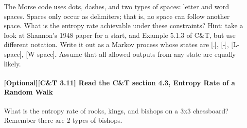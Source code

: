 \documentclass{article}
\begin{document}
The Morse code uses dots, dashes, and two types of spaces: letter and word
spaces.  Spaces only occur as delimiters; that is, no space can follow another
space. What is the entropy rate achievable under these constraints?  Hint: take
a look at Shannon’s 1948 paper for a start, and Example 5.1.3 of C\&T, but use
different notation. Write it out as a Markov process whose states are [.], [-],
[L-space], [W-space]. Assume that all allowed outputs from any state are equally
likely.  

\paragraph{[Optional][C\&T 3.11] Read the C\&T section 4.3, Entropy Rate of a
    Random Walk}  What is the entropy rate of rooks, kings, and bishops on a 3x3
chessboard?  Remember there are 2 types of bishops.
\end{document}

